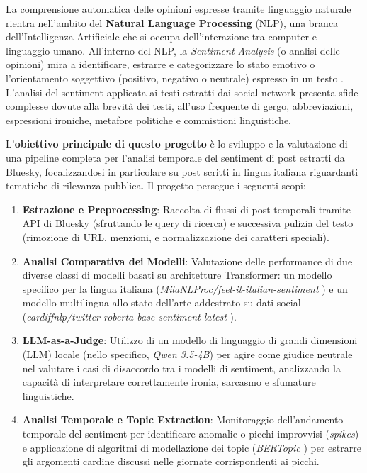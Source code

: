 \documentclass[11pt]{article}
\begin{document}
La comprensione automatica delle opinioni espresse tramite linguaggio naturale rientra nell'ambito del \textbf{Natural Language Processing} (NLP), una branca dell'Intelligenza Artificiale che si occupa dell'interazione tra computer e linguaggio umano. All'interno del NLP, la \textit{Sentiment Analysis} (o analisi delle opinioni) mira a identificare, estrarre e categorizzare lo stato emotivo o l'orientamento soggettivo (positivo, negativo o neutrale) espresso in un testo \cite{liu2012sentiment}. L'analisi del sentiment applicata ai testi estratti dai social network presenta sfide complesse dovute alla brevità dei testi, all'uso frequente di gergo, abbreviazioni, espressioni ironiche, metafore politiche e commistioni linguistiche.

L'\textbf{obiettivo principale di questo progetto} è lo sviluppo e la valutazione di una pipeline completa per l'analisi temporale del sentiment di post estratti da Bluesky, focalizzandosi in particolare su post scritti in lingua italiana riguardanti tematiche di rilevanza pubblica. Il progetto persegue i seguenti scopi:
\begin{enumerate}
    \item \textbf{Estrazione e Preprocessing}: Raccolta di flussi di post temporali tramite API di Bluesky (sfruttando le query di ricerca) e successiva pulizia del testo (rimozione di URL, menzioni, e normalizzazione dei caratteri speciali).
    \item \textbf{Analisi Comparativa dei Modelli}: Valutazione delle performance di due diverse classi di modelli basati su architetture Transformer: un modello specifico per la lingua italiana (\textit{MilaNLProc/feel-it-italian-sentiment} \cite{bianchi2021feelit}) e un modello multilingua allo stato dell'arte addestrato su dati social (\textit{cardiffnlp/twitter-roberta-base-sentiment-latest} \cite{loureiro2022roberta}).
    \item \textbf{LLM-as-a-Judge}: Utilizzo di un modello di linguaggio di grandi dimensioni (LLM) locale (nello specifico, \textit{Qwen 3.5-4B}) per agire come giudice neutrale nel valutare i casi di disaccordo tra i modelli di sentiment, analizzando la capacità di interpretare correttamente ironia, sarcasmo e sfumature linguistiche.
    \item \textbf{Analisi Temporale e Topic Extraction}: Monitoraggio dell'andamento temporale del sentiment per identificare anomalie o picchi improvvisi (\textit{spikes}) e applicazione di algoritmi di modellazione dei topic (\textit{BERTopic} \cite{grootendorst2022bertopic}) per estrarre gli argomenti cardine discussi nelle giornate corrispondenti ai picchi.
\end{enumerate}
\end{document}
